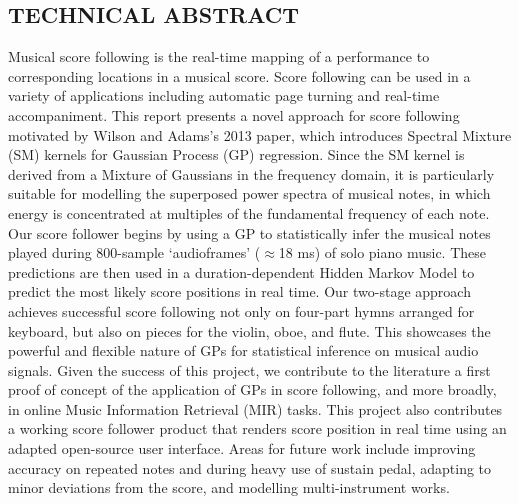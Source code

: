 \subsection*{\centering \uppercase{Technical Abstract}}
Musical score following is the real-time mapping of a performance to corresponding locations in a musical score. Score following can be used in a variety of applications including automatic page turning and real-time accompaniment. 
This report presents a novel approach for score following motivated by Wilson and Adams's 2013 paper, which introduces Spectral Mixture (SM) kernels for Gaussian Process (GP) regression. Since the SM kernel is derived from a Mixture of Gaussians in the frequency domain, it is particularly suitable for modelling the superposed power spectra of musical notes, in which energy is concentrated at multiples of the fundamental frequency of each note.   
Our score follower begins by using a GP to statistically infer the musical notes played during 800-sample `audioframes' ($\approx$18 ms) of solo piano music. 
These predictions are then used in a duration-dependent Hidden Markov Model to predict the most likely score positions in real time. Our two-stage approach achieves successful score following not only on four-part hymns arranged for keyboard, but also on pieces for the violin, oboe, and flute. This showcases the powerful and flexible nature of GPs for statistical inference on musical audio signals. Given the success of this project, we contribute to the literature a first proof of concept of the application of GPs in score
following, and more broadly, in online Music Information Retrieval (MIR) tasks. This project also contributes a working score follower product that renders score position in real time using an adapted open-source user interface. Areas for future work include improving accuracy on repeated notes and during heavy use of sustain pedal, adapting to minor deviations from the score, and modelling multi-instrument works.

